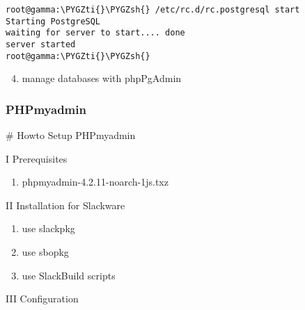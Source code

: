 \documentclass[letterpaper,10pt,english]{sphinxmanual}
\def\PYGZsh{\char`\#}
\def\PYGZti{\char`\~}
\begin{document}
\begin{Verbatim}[commandchars=\\\{\}]
root@gamma:\PYGZti{}\PYGZsh{} /etc/rc.d/rc.postgresql start
Starting PostgreSQL
waiting for server to start.... done
server started
root@gamma:\PYGZti{}\PYGZsh{}
\end{Verbatim}
\begin{enumerate}
\setcounter{enumi}{3}
\item {} 
manage databases with phpPgAdmin

\end{enumerate}


\subsubsection{PHPmyadmin}
\label{sdocs/databases/phpmyadmin/phpmyadmin:phpmyadmin}\label{sdocs/databases/phpmyadmin/phpmyadmin::doc}
\# Howto Setup PHPmyadmin

I Prerequisites
\begin{enumerate}
\item {} 
phpmyadmin-4.2.11-noarch-1js.txz

\end{enumerate}

II Installation for Slackware
\begin{enumerate}
\item {} 
use slackpkg

\item {} 
use sbopkg

\item {} 
use SlackBuild scripts

\end{enumerate}

III Configuration
\end{document}
